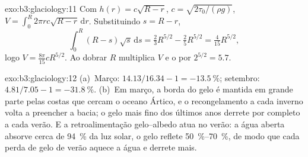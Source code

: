 \begin{solution}{exo:b3:glaciology:11}
Com $h(r) = c\sqrt{R - r}$, $c = \sqrt{2\tau_0/(\rho g)}$, $V =
\int_0^R2\pi rc\sqrt{R - r}\,\mathrm dr$. Substituindo $s = R - r$,
\[
\int_0^R(R - s)\sqrt s\,\mathrm ds = \tfrac23R^{5/2} - \tfrac25R^{5/2} =
\tfrac4{15}R^{5/2},
\]
logo $V = \frac{8\pi}{15}cR^{5/2}$. Ao dobrar $R$
multiplica $V$ e o  por $2^{5/2} = 5.7$.
\end{solution}

\begin{solution}{exo:b3:glaciology:12}
(a)~Março: $14.13/16.34 - 1 = \qty{-13.5}{\percent}$; setembro: $4.81/7.05
- 1 = \qty{-31.8}{\percent}$. (b)~Em março, a borda do gelo é mantida em grande parte pelas
costas que cercam o oceano Ártico, e o recongelamento a cada inverno
volta a preencher a bacia; o gelo mais fino dos últimos anos derrete
por completo a cada verão. E a retroalimentação gelo--albedo atua no verão: a água aberta
absorve cerca de \qty{94}{\percent} da luz solar, o gelo reflete
\qtyrange{50}{70}{\percent}, de modo que cada perda de gelo de verão aquece a água e
derrete mais.
\end{solution}

